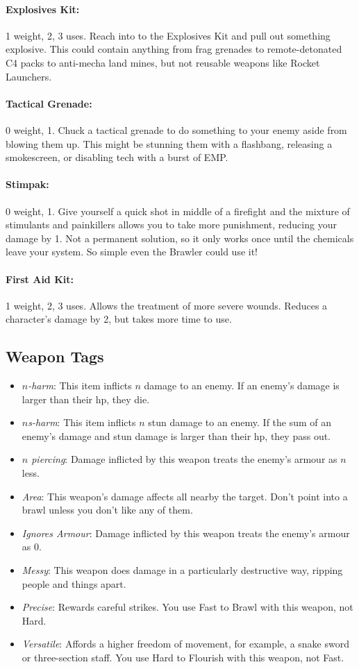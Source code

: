 \paragraph{Explosives Kit:} 1 weight, 2\money, 3 uses. Reach into to the Explosives Kit and pull out something explosive. This could contain anything from frag grenades to remote-detonated C4 packs to anti-mecha land mines, but not reusable weapons like Rocket Launchers.
\paragraph{Tactical Grenade:} 0 weight, 1\money. Chuck a tactical grenade to do something to your enemy aside from blowing them up. This might be stunning them with a flashbang, releasing a smokescreen, or disabling tech with a burst of EMP.
\paragraph{Stimpak:} 0 weight, 1\money. Give yourself a quick shot in middle of a firefight and the mixture of stimulants and painkillers allows you to take more punishment, reducing your damage by 1. Not a permanent solution, so it only works once until the chemicals leave your system. So simple even the Brawler could use it!
\paragraph{First Aid Kit:} 1 weight, 2\money, 3 uses. Allows the treatment of more severe wounds. Reduces a character's damage by 2, but takes more time to use.

\subsection{Weapon Tags}
\begin{itemize}
\item \textit{$n$-harm}: This item inflicts $n$ damage to an enemy. If an enemy's damage is larger than their hp, they die.
\item \textit{$n$s-harm}: This item inflicts $n$ stun damage to an enemy. If the sum of an enemy's damage and stun damage is larger than their hp, they pass out.
\item \textit{$n$ piercing}: Damage inflicted by this weapon treats the enemy's armour as $n$ less. 
\item \textit{Area}: This weapon's damage affects all nearby the target. Don't point into a brawl unless you don't like any of them.
\item \textit{Ignores Armour}: Damage inflicted by this weapon treats the enemy's armour as 0. 
\item \textit{Messy}: This weapon does damage in a particularly destructive way, ripping people and things apart.
\item \textit{Precise}: Rewards careful strikes. You use Fast to Brawl with this weapon, not Hard.
\item \textit{Versatile}: Affords a higher freedom of movement, for example, a snake sword or three-section staff. You use Hard to Flourish with this weapon, not Fast.
\end{itemize}

